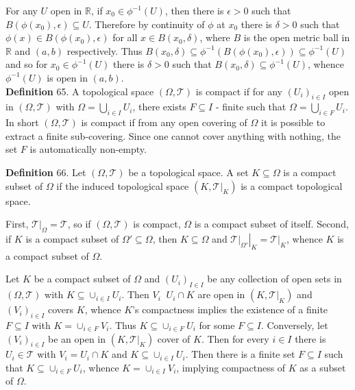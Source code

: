 \documentclass[a4paper]{article}
\newcommand{\brac}[1]{\left ( #1 \right )}
\newcommand{\induc}[1]{\left . #1 \right \vert}
\newcommand{\Real}{\mathbb{R}}
\newcommand{\Tcal}{\mathcal{T}}
\newcommand{\defn}{\mathop{\overset{\Delta}{=}}\nolimits}
\begin{document}
For any $U$ open in $\Real$, if $x_0 \in \phi^{-1}\brac{U}$, then there is $\epsilon>0$ such that $B\brac{\phi\brac{x_0}, \epsilon}\subseteq U$. Therefore by continuity of $\phi$ at $x_0$ there is $\delta>0$ such that $\phi\brac{x}\in B\brac{\phi\brac{x_0}, \epsilon}$ for all $x\in B\brac{x_0, \delta}$, where $B$ is the open metric ball in $\Real$ and $\brac{a,b}$ respectively. Thus $B\brac{x_0, \delta} \subseteq \phi^{-1}\brac{ B\brac{\phi\brac{x_0}, \epsilon} } \subseteq \phi^{-1}\brac{U}$ and so for $x_0 \in \phi^{-1}\brac{U}$ there is $\delta>0$ such that $B\brac{x_0, \delta}\subseteq \phi^{-1}\brac{U}$, whence $\phi^{-1}\brac{U}$ is open in $\brac{a,b}$.\\

\noindent \textbf{Definition} 65.
A topological space $\brac{\Omega, \Tcal}$ is compact if for any $\brac{U_i}_{i\in I}$ open in $\brac{\Omega, \Tcal}$ with $\Omega = \bigcup_{i\in I} U_i$, there exists $F\subseteq I$ - finite such that $\Omega = \bigcup_{i\in F} U_i$. In short $\brac{\Omega, \Tcal}$ is compact if from any open covering of $\Omega$ it is possible to extract a finite sub-covering. Since one cannot cover anything with nothing, the set $F$ is automatically non-empty.

\noindent \textbf{Definition} 66.
Let $\brac{\Omega, \Tcal}$ be a topological space. A set $K\subseteq \Omega$ is a compact subset of $\Omega$ if the induced topological space $\brac{K, \induc{\Tcal}_K}$ is a compact topological space.

First, $\induc{\Tcal}_\Omega = \Tcal$, so if $\brac{\Omega, \Tcal}$ is compact, $\Omega$ is a compact subset of itself. Second, if $K$ is a compact subset of $\Omega'\subseteq \Omega$, then $K\subseteq \Omega$ and $\induc{\induc{\Tcal}_{\Omega'}}_K = \induc{\Tcal}_K$, whence $K$ is a compact subset of $\Omega$.

Let $K$ be a compact subset of $\Omega$ and $\brac{U_i}_{I\in I}$ be any collection of open sets in $\brac{\Omega, \Tcal}$ with $K\subseteq \cup_{i\in I} U_i$. Then $V_i\defn U_i\cap K$ are open in $\brac{K, \induc{\Tcal}_K}$ and $\brac{V_i}_{i\in I}$ covers $K$, whence $K$'s compactness implies the existence of a finite $F\subseteq I$ with $K=\cup_{i\in F} V_i$. Thus $K\subseteq \cup_{i\in F} U_i$ for some $F\subseteq I$. Conversely, let $\brac{V_i}_{i\in I}$ be an open in $\brac{K, \induc{\Tcal}_K}$ cover of $K$. Then for every $i\in I$ there is $U_i\in \Tcal$ with $V_i = U_i \cap K$ and $K\subseteq \cup_{i\in I} U_i$. Then there is a finite set $F\subseteq I$ such that $K\subseteq \cup_{i\in F} U_i$, whence $K = \cup_{i\in I} V_i$, implying compactness of $K$ as a subset of $\Omega$.
\end{document}
